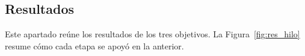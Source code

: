 \subsection{Resultados}
\label{sec:resultados}

Este apartado reúne los resultados de los tres objetivos. La Figura~\ref{fig:res_hilo} resume cómo cada etapa se apoyó en la anterior.

